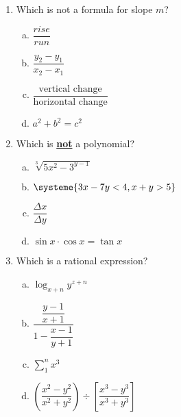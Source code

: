 \documentclass[12pt, letterpaper]{article}
\begin{document}
	\begin{enumerate}[resume]
		\item Which is not a formula for slope $ m $?
		
		\begin{multicols}{4}
		\begin{enumerate}[a. ]
				\item $ \dfrac{rise}{run} $
				\item $ \dfrac{y_2 - y_1}{x_2 - x_1} $
				\item $ \dfrac{\text{vertical change}}{\text{horizontal change}} $
				\item $ a^2 + b^2 = c^2 $
		\end{enumerate}
	\end{multicols}
	
		\item Which is \textbf{\underline{not}} a polynomial?
		
		\begin{multicols}{2}
		\begin{enumerate}[a. ]
			
				\item $ \sqrt[3]{5 x^2 - 3^{y - 1} }$
				\item $ \systeme{3x - 7y < 4, x + y > 5} $
				\item $ \dfrac{\Delta x}{\Delta y} $
				\item $ \sin x \cdot \cos x = \tan x $
		\end{enumerate}
	\end{multicols}
	
		\item Which is a rational expression?
		
		\begin{multicols}{2}
		\begin{enumerate}[a. ]
				
					\item $ \log_{x + n} y^{z + n} $
					\item $ \dfrac{\dfrac{y - 1}{x + 1}}{1 - \dfrac{x - 1}{y + 1}} $
					\item $ \sum_{1}^{n} x^3 $
					\item $ \left(\dfrac{x^2 - y^2}{x^2 + y^2}\right) \div \left[\dfrac{x^3 - y ^3}{x^3 + y^3}\right] $
				
		\end{enumerate}
	\end{multicols}
	
	\end{enumerate}
\end{document}
